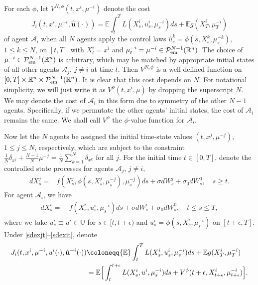 \documentclass{amsart}
\theoremstyle{definition}
\theoremstyle{remark}
\def\cal{\mathcal}
\def\EE{{\mathbb E}}
\def\deltae{\epsilon}
\numberwithin{equation}{section}
\begin{document}
For each $\phi$,
let $V^{N,\phi}(t, x^i, \mu^{-i})$ denote the cost
$$J_i(t,x^i, \mu^{-i},\hat{\mathbf{u}}(\cdot))=\EE\int_t^T L(X_s^i, u_s^i, \mu_{s}^{-i}) ds +\EE g(X_T^i, \mu_T^{-i})$$
of agent ${\cal A}_i$ when all $N$ agents apply the control laws $\hat u^k_s= \phi (s,X_s^k, \mu_s^{-k} ) $, $1\le k\le N$, on $[t,T]$
with $X_t^i=x^i$ and
$\mu_{t}^{-i}=\mu^{-i}\in {\mathcal P}_{\rm em}^{N-1}(\mathbb{R}^n)$.
The choice of $\mu^{-i}\in{\mathcal P}_{\rm em}^{N-1}(\mathbb{R}^n) $ is arbitrary, which may be matched by appropriate initial states of all other agents ${\mathcal A}_j$, $j\ne i$ at time $t$.   Then $V^{N,\phi}$ is a well-defined function on $[0,T]\times \mathbb{R}^n
\times {\mathcal P}_{\rm em}^{N-1}(\mathbb{R}^n)$.
It is clear that this cost depends on $N$. For notational simplicity, we will
just write it as $V^{\phi}(t, x^i, \mu)$ by dropping the superscript $N$. We may denote the cost of ${\cal A}_i$ in this form due to symmetry of the other $N-1$ agents. Specifically, if we permutate the other agents' initial states, the cost of ${\cal A}_i$ remains the same.
 We shall call $V^\phi$ the $\phi$-value function for ${\cal A}_i$.









Now let the $N$ agents be assigned the initial time-state values  $(t, x^j, \mu^{-j} )$, $1\le j\le N$, respectively, which are subject to the constraint
$\frac{1}{N}\delta_{x^j} + \frac{N-1}{N} \mu^{-j} = \frac{1}{N}\sum_{k=1}^N \delta_{x^k} $ for all $ j$.
For the initial time $t\in [0,T]$, denote the controlled state processes
for agents ${\cal A}_j$, $j\ne i$,
\begin{align}
dX_s^j=& f(X_s^j,
 \phi(s, X_s^j,  \mu_s^{-j}), \mu_s^{-j}) ds
  +\sigma dW_s^j +\sigma_0 dW_s^0,\quad s\ge t. \label{sdexjt}
\end{align}
For agent ${\cal A}_i$, we have
\begin{align}
dX_s^i =\ &f(X_s^i, u_s^i, \mu_s^{-i})ds +\sigma dW_s^i
 +\sigma_0 dW_s^0,\quad  t\le s\le T,\label{sdexit}
\end{align}
where we take $u_s^i\equiv u^i\in \mathbb{U}$ for $s\in [t,t+\deltae)$ and $u_s^i=\phi(s,X_s^i, \mu_s^{-i})$ on $[t+\deltae, T]$.
Under \eqref{sdexjt}--\eqref{sdexit}, denote
\begin{align}
J_i(t,x^i, \mu^{-i},u^i(\cdot), \hat {\mathbf u}^{-i}(\cdot)) & \coloneqq\EE\int_t^T L(X_s^i, u_s^i, \mu_{s}^{-i}) ds +\EE g(X_T^i, \mu_T^{-i}) \notag \\
 &= \EE\Big[ \int_t^{t+\epsilon} L(X_s^i, u^i,
\mu_s^{-i})ds+
V^\phi({t+\epsilon}, X^i_{t+\epsilon}, \mu^{-i}_{t+\epsilon} ) \Big].\label{Jidel}
\end{align}
\end{document}
